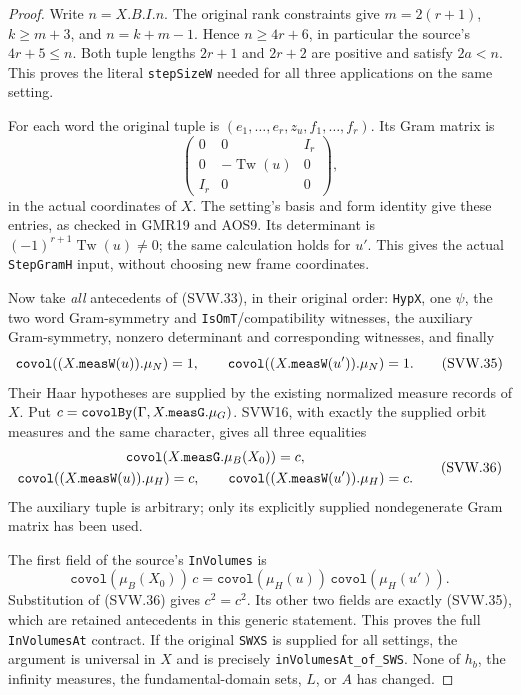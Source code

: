 \documentclass[11pt,a4paper]{article}
\numberwithin{equation}{section}
\theoremstyle{remark}\newtheorem{remark}[theorem]{Remark}
\begin{document}
\begin{proof}
Write $n=X.B.I.n$.  The original rank constraints give
$m=2(r+1)$, $k\geq m+3$, and $n=k+m-1$.  Hence
$n\geq4r+6$, in particular the source's $4r+5\leq n$.
Both tuple lengths $2r+1$ and $2r+2$ are positive and satisfy
$2a<n$.  This proves the literal \texttt{step\allowbreak Size\allowbreak W} needed for
all three applications on the same setting.

For each word the original tuple is
$(e_1,\ldots,e_r,z_u,f_1,\ldots,f_r)$.  Its Gram matrix is
\[
 \begin{pmatrix}
   0&0&I_r\\0&-\operatorname{Tw}(u)&0\\I_r&0&0
 \end{pmatrix},
 \tag{SVW.34}
\]
in the actual coordinates of $X$.  The setting's basis and form
identity give these entries, as checked in GMR19 and AOS9.  Its
determinant is $(-1)^{r+1}\operatorname{Tw}(u)\ne0$; the same
calculation holds for $u'$.  This gives the actual
\texttt{Step\allowbreak Gram\allowbreak H} input, without choosing new frame coordinates.

Now take \emph{all} antecedents of (SVW.33), in their original
order: \texttt{Hyp\allowbreak X}, one $\psi$, the two word Gram-symmetry and
\texttt{Is\allowbreak Om\allowbreak T}/compatibility witnesses, the auxiliary Gram-symmetry,
nonzero determinant and corresponding witnesses, and finally
\[
 \texttt{covol}((X.\texttt{meas\allowbreak W}(u)).\mu_N)=1,
 \qquad
 \texttt{covol}((X.\texttt{meas\allowbreak W}(u')).\mu_N)=1.
 \tag{SVW.35}
\]
Their Haar hypotheses are supplied by the existing normalized
measure records of $X$.  Put
$c=\texttt{covol\allowbreak By}(\Gamma,X.\texttt{meas\allowbreak G}.\mu_G)$.
SVW16, with exactly the supplied orbit measures and the same
character, gives all three equalities
\[
 \begin{gathered}
 \texttt{covol}(X.\texttt{meas\allowbreak G}.\mu_B(X_0))=c,\\
 \texttt{covol}((X.\texttt{meas\allowbreak W}(u)).\mu_H)=c,
 \qquad
 \texttt{covol}((X.\texttt{meas\allowbreak W}(u')).\mu_H)=c.
 \end{gathered}
 \tag{SVW.36}
\]
The auxiliary tuple is arbitrary; only its explicitly supplied
nondegenerate Gram matrix has been used.

The first field of the source's \texttt{In\allowbreak Volumes} is
\[
 \texttt{covol}(\mu_B(X_0))\,c
       =\texttt{covol}(\mu_H(u))\,
                               \texttt{covol}(\mu_H(u')).
 \tag{SVW.37}
\]
Substitution of (SVW.36) gives $c^2=c^2$.  Its other two fields
are exactly (SVW.35), which are retained antecedents in this
generic statement.  This proves the full \texttt{In\allowbreak Volumes\allowbreak At}
contract.  If the original \texttt{SWXS} is supplied for all
settings, the argument is universal in $X$ and is precisely
\texttt{in\allowbreak Volumes\allowbreak At\_\allowbreak of\_\allowbreak SWS}.  None of $h_b$, the infinity
measures, the fundamental-domain sets, $L$, or $A$ has changed.
\end{proof}
\end{document}
